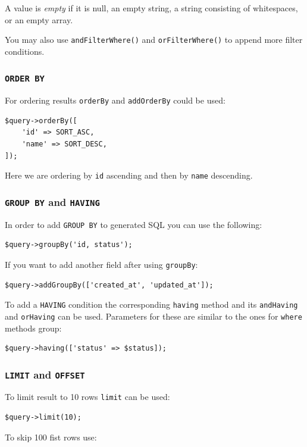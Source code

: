 A value is \textit{empty} if it is null, an empty string, a string consisting of whitespaces, or an empty array.

You may also use \lstinline|andFilterWhere()| and \lstinline|orFilterWhere()| to append more filter conditions.

\subsubsection{\lstinline|ORDER BY|}
For ordering results \lstinline|orderBy| and \lstinline|addOrderBy| could be used:

\lstset{language=php}\begin{lstlisting}
$query->orderBy([
    'id' => SORT_ASC,
    'name' => SORT_DESC,
]);
\end{lstlisting}
Here we are ordering by \lstinline|id| ascending and then by \lstinline|name| descending.

\subsubsection{\lstinline|GROUP BY| and \lstinline|HAVING|}
In order to add \lstinline|GROUP BY| to generated SQL you can use the following:

\lstset{language=php}\begin{lstlisting}
$query->groupBy('id, status');
\end{lstlisting}
If you want to add another field after using \lstinline|groupBy|:

\lstset{language=php}\begin{lstlisting}
$query->addGroupBy(['created_at', 'updated_at']);
\end{lstlisting}
To add a \lstinline|HAVING| condition the corresponding \lstinline|having| method and its \lstinline|andHaving| and \lstinline|orHaving| can be used. Parameters
for these are similar to the ones for \lstinline|where| methods group:

\lstset{language=php}\begin{lstlisting}
$query->having(['status' => $status]);
\end{lstlisting}
\subsubsection{\lstinline|LIMIT| and \lstinline|OFFSET|}
To limit result to 10 rows \lstinline|limit| can be used:

\lstset{language=php}\begin{lstlisting}
$query->limit(10);
\end{lstlisting}
To skip 100 fist rows use:

